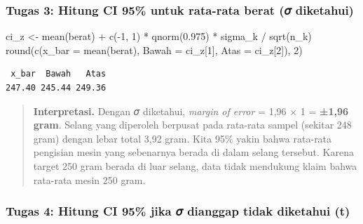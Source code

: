\documentclass[
  indonesian,
  letterpaper,
]{book}
\newenvironment{Shaded}{\begin{snugshade}}{\end{snugshade}}
\newcommand{\AttributeTok}[1]{\textcolor[rgb]{0.40,0.45,0.13}{#1}}
\newcommand{\DecValTok}[1]{\textcolor[rgb]{0.68,0.00,0.00}{#1}}
\newcommand{\FloatTok}[1]{\textcolor[rgb]{0.68,0.00,0.00}{#1}}
\newcommand{\FunctionTok}[1]{\textcolor[rgb]{0.28,0.35,0.67}{#1}}
\newcommand{\NormalTok}[1]{\textcolor[rgb]{0.00,0.23,0.31}{#1}}
\newcommand{\OtherTok}[1]{\textcolor[rgb]{0.00,0.23,0.31}{#1}}
\newcommand{\SpecialCharTok}[1]{\textcolor[rgb]{0.37,0.37,0.37}{#1}}
\begin{document}
\subsubsection{Tugas 3: Hitung CI 95\% untuk rata-rata berat (𝜎
diketahui)}\label{tugas-3-hitung-ci-95-untuk-rata-rata-berat-ux1d70e-diketahui}

\begin{Shaded}
\begin{Highlighting}[]
\NormalTok{ci\_z }\OtherTok{\textless{}{-}} \FunctionTok{mean}\NormalTok{(berat) }\SpecialCharTok{+} \FunctionTok{c}\NormalTok{(}\SpecialCharTok{{-}}\DecValTok{1}\NormalTok{, }\DecValTok{1}\NormalTok{) }\SpecialCharTok{*} \FunctionTok{qnorm}\NormalTok{(}\FloatTok{0.975}\NormalTok{) }\SpecialCharTok{*}\NormalTok{ sigma\_k }\SpecialCharTok{/} \FunctionTok{sqrt}\NormalTok{(n\_k)}
\FunctionTok{round}\NormalTok{(}\FunctionTok{c}\NormalTok{(}\AttributeTok{x\_bar =} \FunctionTok{mean}\NormalTok{(berat), }\AttributeTok{Bawah =}\NormalTok{ ci\_z[}\DecValTok{1}\NormalTok{], }\AttributeTok{Atas =}\NormalTok{ ci\_z[}\DecValTok{2}\NormalTok{]), }\DecValTok{2}\NormalTok{)}
\end{Highlighting}
\end{Shaded}

\begin{verbatim}
 x_bar  Bawah   Atas 
247.40 245.44 249.36 
\end{verbatim}

\begin{quote}
\textbf{Interpretasi.} Dengan 𝜎 diketahui, \emph{margin of error} = 1,96
× 1 = \textbf{±1,96 gram}. Selang yang diperoleh berpusat pada rata-rata
sampel (sekitar 248 gram) dengan lebar total 3,92 gram. Kita 95\% yakin
bahwa rata-rata pengisian mesin yang sebenarnya berada di dalam selang
tersebut. Karena target 250 gram berada di luar selang, data tidak
mendukung klaim bahwa rata-rata mesin 250 gram.
\end{quote}

\subsubsection{Tugas 4: Hitung CI 95\% jika 𝜎 dianggap tidak diketahui
(t)}\label{tugas-4-hitung-ci-95-jika-ux1d70e-dianggap-tidak-diketahui-t}

\begin{Shaded}
\end{Shaded}
\end{document}
